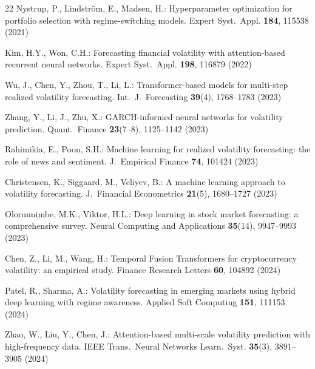 \documentclass[runningheads]{llncs}
\begin{document}
\begin{thebibliography}{22}
Nystrup, P., Lindstr\"om, E., Madsen, H.: Hyperparameter optimization for portfolio selection with regime-switching models. Expert Syst.~Appl. \textbf{184}, 115538 (2021)

Kim, H.Y., Won, C.H.: Forecasting financial volatility with attention-based recurrent neural networks. Expert Syst.~Appl. \textbf{198}, 116879 (2022)

Wu, J., Chen, Y., Zhou, T., Li, L.: Transformer-based models for multi-step realized volatility forecasting. Int.~J.~Forecasting \textbf{39}(4), 1768--1783 (2023)

Zhang, Y., Li, J., Zhu, X.: GARCH-informed neural networks for volatility prediction. Quant.~Finance \textbf{23}(7--8), 1125--1142 (2023)

Rahimikia, E., Poon, S.H.: Machine learning for realized volatility forecasting: the role of news and sentiment. J.~Empirical Finance \textbf{74}, 101424 (2023)

Christensen, K., Siggaard, M., Veliyev, B.: A machine learning approach to volatility forecasting. J.~Financial Econometrics \textbf{21}(5), 1680--1727 (2023)

Olorunnimbe, M.K., Viktor, H.L.: Deep learning in stock market forecasting: a comprehensive survey. Neural Computing and Applications \textbf{35}(14), 9947--9993 (2023)

Chen, Z., Li, M., Wang, H.: Temporal Fusion Transformers for cryptocurrency volatility: an empirical study. Finance Research Letters \textbf{60}, 104892 (2024)

Patel, R., Sharma, A.: Volatility forecasting in emerging markets using hybrid deep learning with regime awareness. Applied Soft Computing \textbf{151}, 111153 (2024)

Zhao, W., Liu, Y., Chen, J.: Attention-based multi-scale volatility prediction with high-frequency data. IEEE Trans.~Neural Networks Learn.~Syst. \textbf{35}(3), 3891--3905 (2024)

\end{thebibliography}
\end{document}
